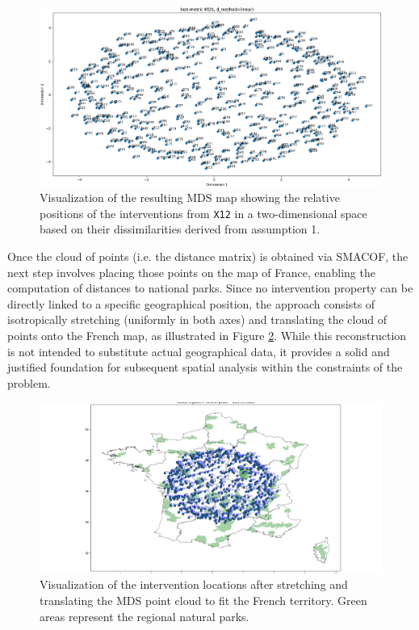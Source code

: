 \begin{figure}[!ht]
    \centering
    \includegraphics[width=\textwidth]{ch3/figures/points.png}
    \caption{Visualization of the resulting MDS map showing the relative positions of the interventions from \texttt{X12} in a two-dimensional space based on their dissimilarities derived from assumption 1.}
    \label{fig:mds_map}
\end{figure}

Once the cloud of points (i.e. the distance matrix) is obtained via SMACOF, the next step involves placing those points on the map of France, enabling the computation of distances to national parks. Since no intervention property can be directly linked to a specific geographical position, the approach consists of isotropically stretching (uniformly in both axes) and translating the cloud of points onto the French map, as illustrated in Figure \ref{fig:map_france}. While this reconstruction is not intended to substitute actual geographical data, it provides a solid and justified foundation for subsequent spatial analysis within the constraints of the problem.

\begin{figure}[!ht]
    \centering
    \includegraphics[width=\textwidth]{ch3/figures/Map of France.png}
    \caption{Visualization of the intervention locations after stretching and translating the MDS point cloud to fit the French territory. Green areas represent the regional natural parks.}
    \label{fig:map_france}
\end{figure}


